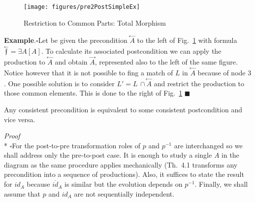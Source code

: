 \documentclass{fundam}
\newcommand{\proofend}{\hfill$\blacksquare$}
\begin{document}
\begin{figure}[htbp]
  \centering
  \texttt{[image: figures/pre2PostSimpleEx]}
  \caption{Restriction to Common Parts: Total Morphism}
  \label{fig:pre2PostSimpleEx}
\end{figure}

\noindent \textbf{Example}.$\square$Let be given the precondition
$\stackrel{\leftarrow}{A}$ to the left of
Fig.~\ref{fig:pre2PostSimpleEx} with formula
$\stackrel{\leftarrow}{\mathfrak{f}} = \exists A [A]$. To calculate its
associated postcondition we can apply the production to
$\stackrel{\leftarrow}{A}$ and obtain $\stackrel{\rightarrow}{A}$,
represented also to the left of the same figure. Notice however that
it is not possible to fing a match of $L$ in
$\stackrel{\leftarrow}{A}$ because of node $3$. One possible solution
is to consider $L' = L \, \cap \stackrel{\leftarrow}{A}$ and restrict
the production to those common elements. This is done to the right of
Fig.~\ref{fig:pre2PostSimpleEx} \proofend

\begin{theorem}
  \label{th:prePostPre}
  Any consistent precondition is equivalent to some consistent
  postcondition and vice versa.
\end{theorem}

\noindent \emph{Proof} \\*
$\square$For the post-to-pre transformation roles of $p$ and $p^{-1}$
are interchanged so we shall address only the pre-to-post case. It is
enough to study a single $A$ in the diagram as the same procedure
applies mechanically (Th.~4.1 transforms any precondition into a
sequence of productions). Also, it suffices to state the result for
$id_A$ because $\overline{id}_A$ is similar but the evolution depends
on $p^{-1}$. Finally, we shall assume that $p$ and $id_A$ are not
sequentially independent.
\end{document}
